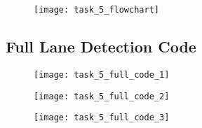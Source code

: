\documentclass[conference]{IEEEtran}
\begin{document}
\begin{appendix}
\begin{figure}[H]
\centerline{\texttt{[image: task\_5\_flowchart]}}
\end{figure}

\subsection{Full Lane Detection Code} \label{appendix:task_5_lane_code}

\begin{figure}[H]
\centerline{\texttt{[image: task\_5\_full\_code\_1]}}
\end{figure}

\begin{figure}[H]
\centerline{\texttt{[image: task\_5\_full\_code\_2]}}
\end{figure}

\begin{figure}[H]
\centerline{\texttt{[image: task\_5\_full\_code\_3]}}
\end{figure}

\end{appendix}
\end{document}
